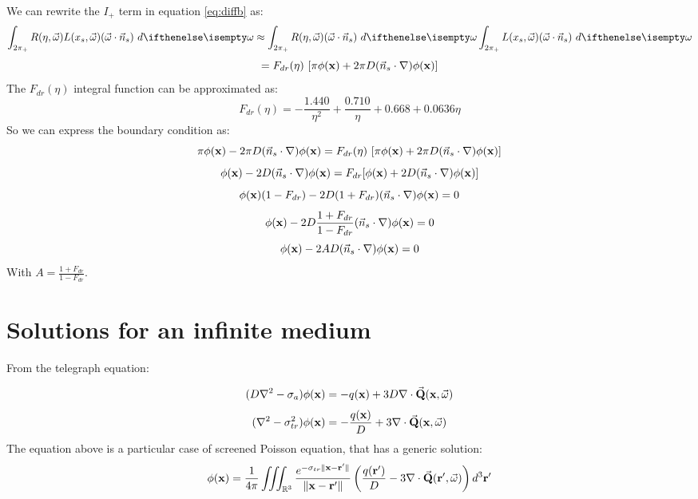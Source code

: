 \documentclass[10pt,a4paper]{article}
\begin{document}
We can rewrite the $I_+$ term in equation \ref{eq:diffb} as:
$$
 \hemisphere{R(\eta, \omegavec) L(x_s, \omegavec) (\omegavec \cdot \vec{n}_s)}{} \approx \hemisphere{R(\eta, \omegavec)  (\omegavec \cdot \vec{n}_s)}{} \hemisphere{L(x_s, \omegavec) (\omegavec \cdot \vec{n}_s)}{}
$$
$$
= F_{dr}(\eta)\  [\pi {\phi}(\mathbf{x}) + 2 \pi D (\vec{n}_s \cdot {\nabla}) {\phi}(\mathbf{x})]
$$
The $F_{dr}(\eta)$ integral function can be approximated as:
$$
F_{dr}(\eta) = -\frac{1.440}{\eta^2} +\frac{0.710}{\eta} + 0.668 + 0.0636 \eta
$$
So we can express the boundary condition as:
$$
\pi {\phi}(\mathbf{x}) - 2 \pi D (\vec{n}_s \cdot {\nabla}) {\phi}(\mathbf{x}) = F_{dr}(\eta)\  [\pi {\phi}(\mathbf{x}) + 2 \pi D (\vec{n}_s \cdot {\nabla}) {\phi}(\mathbf{x})]
$$
$$
{\phi}(\mathbf{x}) - 2 D (\vec{n}_s \cdot {\nabla}) {\phi}(\mathbf{x}) = F_{dr}  [{\phi}(\mathbf{x}) + 2 D (\vec{n}_s \cdot {\nabla}) {\phi}(\mathbf{x})]
$$
$$
{\phi}(\mathbf{x}) (1 - F_{dr}) - 2 D (1 + F_{dr}) (\vec{n}_s \cdot {\nabla}) {\phi}(\mathbf{x}) = 0
$$
$$
{\phi}(\mathbf{x}) - 2 D \frac{1 + F_{dr}}{1 - F_{dr}} (\vec{n}_s \cdot {\nabla}) {\phi}(\mathbf{x}) = 0
$$
$$
{\phi}(\mathbf{x}) - 2 A D (\vec{n}_s \cdot {\nabla}) {\phi}(\mathbf{x}) = 0
$$
With $A = \frac{1 + F_{dr}}{1 - F_{dr}}$.

\section{Solutions for an infinite medium}
From the telegraph equation:

$$
(D \nabla^2 - \sigma_a) {\phi}(\mathbf{x}) =  - {q}(\mathbf{x}) + 3 D {\nabla} \cdot \vec{\mathbf{Q}}(\mathbf{x}, \vec{\omega})
$$
$$
(\nabla^2 - \sigma_{tr}^2) {\phi}(\mathbf{x}) =  -  \frac{{q}(\mathbf{x})}{D} + 3 {\nabla} \cdot \vec{\mathbf{Q}}(\mathbf{x}, \vec{\omega})
$$
The equation above is a particular case of screened Poisson equation, that has a generic solution:
$$
{\phi}(\mathbf{x}) = \frac{1}{4 \pi} \iiint_{\mathbb{R}^3} \frac{e^{-\sigma_{tr} \|\mathbf{x} - \mathbf{r}' \|}}{\|\mathbf{x} - \mathbf{r}' \|} \left(  \frac{{q}(\mathbf{r'})}{D} - 3 {\nabla} \cdot \vec{\mathbf{Q}}(\mathbf{r'}, \vec{\omega})\right) d^3 \mathbf{r}'
\label{eq:poisson}
$$
\end{document}
